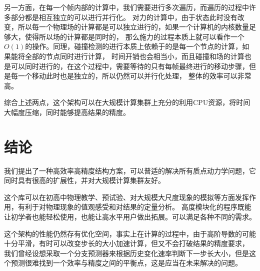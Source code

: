 另一方面，在每一个帧内部的计算中，我们需要进行多次遍历，而遍历的过程中许多部分都是相互独立的可以进行并行化。
对力的计算中，由于状态此时没有改变，所以每一个物理场的计算都是可以独立进行的，如果一个计算机的内核数量足够大，使得所以场的计算都是同时的，
那么施力的过程本质上就可以看作一个$O(1)$的操作。同理，碰撞检测的进行本质上依赖于的是每一个节点的计算，如果能将全部的节点同时进行计算，
时间开销也会相当小，而且碰撞和场的计算也是可以同时进行的，在这个过程中，需要等待的只有每帧最终进行的移动步骤，但是每一个移动此时也是独立的，所以仍然可以并行化处理，
整体的效率可以非常高。

综合上述两点，这个架构可以在大规模计算集群上充分的利用CPU资源，将时间大幅度压缩，同时能够提高结果的精度。
\chapter{结论}
我们提出了一种高效率高精度结构方案，可以普适的解决所有质点动力学问题，它同时具有很高的扩展性，并对大规模计算集群友好。

这个库可以在初高中物理教学、预试验、对大规模大尺度现象的模拟等方面发挥作用，有利于对物理现象的值观感受和对结果的定量分析。
高度模块化的程序既能让初学者也能轻松使用，也能让高水平用户做出拓展。可以满足各种不同的需求。

这个架构的性能仍然存有优化空间，事实上在计算的过程中，由于高阶导数的可能十分平滑，有时可以改变步长的大小加速计算，但又不会打破结果的精度要求，
我们曾经设想采取一个分支预测器来根据历史变化速率判断下一步长大小，但是这个预测很难找到一个效率与精度之间的平衡点，这是应当在未来解决的问题。
